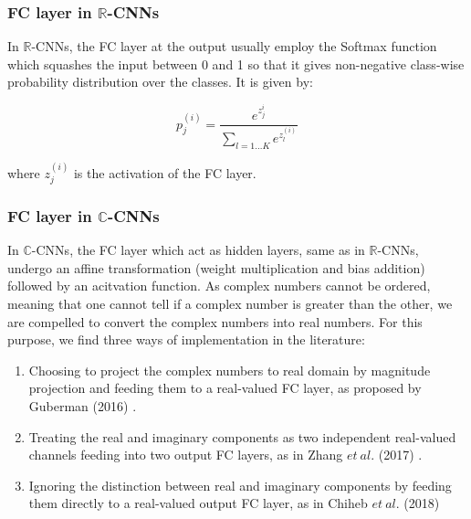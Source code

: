   \subsubsection{FC layer in $\mathbb{R}$-CNNs}
 In $\mathbb{R}$-CNNs, the FC layer at the output usually employ the Softmax function which squashes the input between 0 and 1 so that it gives non-negative class-wise probability distribution over the classes. It is given by:
 
 
 
 \begin{equation} p_j^{(i)}=\frac{e^{z_j^i}}{\underset{l=1...K}{\sum}e^{z_l^{(i)}}} 
 \end{equation}
 
 where $z_j^{(i)}$ is the activation of the FC layer. 

\subsubsection{FC layer in $\mathbb{C}$-CNNs}
In $\mathbb{C}$-CNNs, the FC layer which act as hidden layers, same as in $\mathbb{R}$-CNNs, undergo an affine transformation (weight multiplication and bias addition) followed by an acitvation function. As complex numbers cannot be ordered, meaning that one cannot tell if a complex number is greater than the other, we are compelled to convert the complex numbers into real numbers. For this purpose, we find three ways of implementation in the literature: 
\begin{enumerate}
\item Choosing to project the complex numbers to real domain by magnitude projection and feeding them to a real-valued FC layer, as proposed by Guberman (2016) \cite{Guberman}.
\item Treating the real and imaginary components as two independent real-valued channels feeding into two output FC layers, as in Zhang $et \ al.$ (2017) \cite{polsarzhang2017complex}.
\item Ignoring the distinction between real and imaginary components by feeding them directly to a real-valued output FC layer, as in Chiheb $et \ al.$ (2018) \cite{trabelsi2018deep} 
\end{enumerate}


